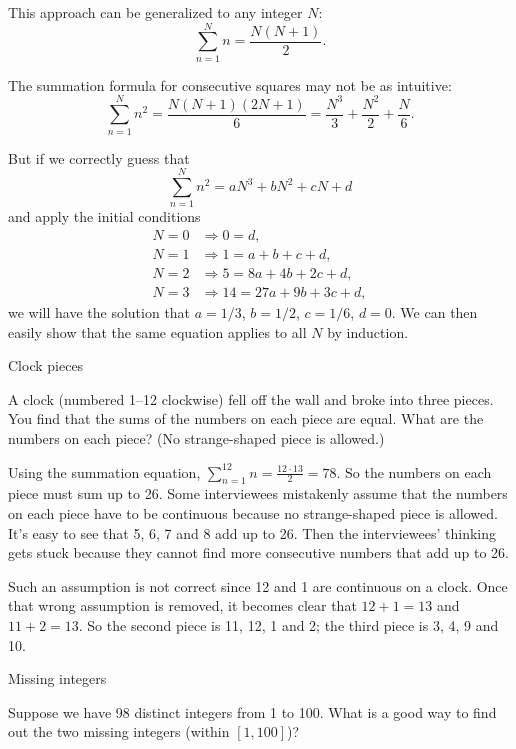
This approach can be generalized to any integer $N$:
\[
  \sum_{n=1}^{N} n = \frac{N(N+1)}{2}.
\]

The summation formula for consecutive squares may not be as intuitive:
\[
  \sum_{n=1}^{N} n^2
  = \frac{N(N+1)(2N+1)}{6}
  = \frac{N^3}{3}+\frac{N^2}{2}+\frac{N}{6}.
\]

But if we correctly guess that
\[
  \sum_{n=1}^{N} n^2 = aN^3+bN^2+cN+d
\]
and apply the initial conditions
\begin{align*}
  N=0 &\Rightarrow 0=d,\\
  N=1 &\Rightarrow 1=a+b+c+d,\\
  N=2 &\Rightarrow 5=8a+4b+2c+d,\\
  N=3 &\Rightarrow 14=27a+9b+3c+d,
\end{align*}
we will have the solution that $a=1/3$, $b=1/2$, $c=1/6$, $d=0$. We can then easily show
that the same equation applies to all $N$ by induction.

\begin{problem}{Clock pieces}

A clock (numbered 1--12 clockwise) fell off the wall and broke into three pieces. You
find that the sums of the numbers on each piece are equal. What are the numbers on each
piece? (No strange-shaped piece is allowed.)
\end{problem}

\begin{solution}
Using the summation equation, $\displaystyle\sum_{n=1}^{12}n=\frac{12\cdot13}{2}=78$. So the numbers on each
piece must sum up to 26. Some interviewees mistakenly assume that the numbers on
each piece have to be continuous because no strange-shaped piece is allowed. It's easy to
see that 5, 6, 7 and 8 add up to 26. Then the interviewees' thinking gets stuck because
they cannot find more consecutive numbers that add up to 26.

Such an assumption is not correct since 12 and 1 are continuous on a clock. Once that
wrong assumption is removed, it becomes clear that $12+1=13$ and $11+2=13$. So the
second piece is 11, 12, 1 and 2; the third piece is 3, 4, 9 and 10.
\end{solution}

\begin{problem}{Missing integers}

Suppose we have 98 distinct integers from 1 to 100. What is a good way to find out the
two missing integers (within $[1,100]$)?
\end{problem}

